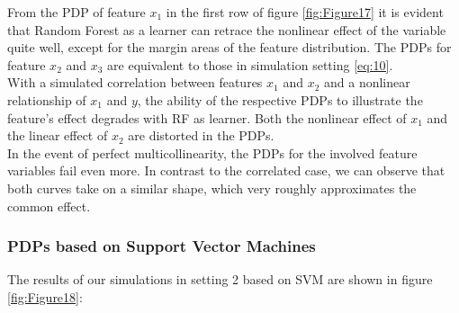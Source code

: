 \documentclass[
]{krantz}
\begin{document}
From the PDP of feature \(x_1\) in the first row of figure \ref{fig:Figure17} it is evident that Random Forest as a learner can retrace the nonlinear effect of the variable quite well, except for the margin areas of the feature distribution. The PDPs for feature \(x_2\) and \(x_3\) are equivalent to those in simulation setting \eqref{eq:10}.\\
With a simulated correlation between features \(x_1\) and \(x_2\) and a nonlinear relationship of \(x_1\) and \(y\), the ability of the respective PDPs to illustrate the feature's effect degrades with RF as learner. Both the nonlinear effect of \(x_1\) and the linear effect of \(x_2\) are distorted in the PDPs.\\
In the event of perfect multicollinearity, the PDPs for the involved feature variables fail even more. In contrast to the correlated case, we can observe that both curves take on a similar shape, which very roughly approximates the common effect.

\hypertarget{pdps-based-on-support-vector-machines-1}{%
\subsubsection{PDPs based on Support Vector Machines}\label{pdps-based-on-support-vector-machines-1}}

The results of our simulations in setting 2 based on SVM are shown in figure \ref{fig:Figure18}:
\end{document}
